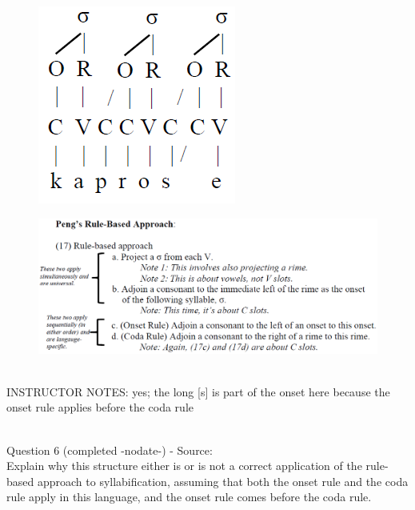 \documentclass[12pt]{article}
\begin{document}
\begin{figure}[H]
\includegraphics{../images/pengrules_kaprosse_yes.png}
\end{figure}
\begin{figure}[H]
\includegraphics{../images/peng_rules.png}
\end{figure}

~\\
INSTRUCTOR NOTES: yes; the long [s] is part of the onset here because the onset rule applies before the coda rule


~\\

{\large Question 6} (completed -nodate-) - Source: \\

Explain why this structure either is or is not a correct application of the rule-based approach to syllabification, assuming that both the onset rule and the coda rule apply in this language, and the onset rule comes before the coda rule.\\
\end{document}

